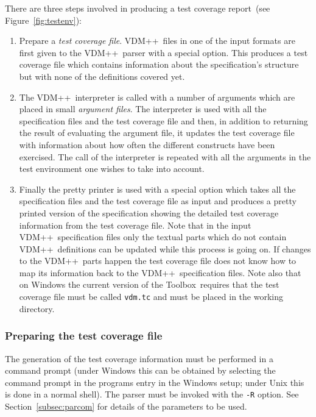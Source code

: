 \documentclass[\pformat,12pt]{article}
\newcommand{\vdmslpp}{VDM++}
\newcommand{\Toolbox}{Toolbox}
\begin{document}
There are three steps involved in producing a test coverage
report~(see Figure~\ref{fig:testenv}):

\begin{enumerate}

\item Prepare a {\em test coverage file}.
  \vdmslpp\ files in one of the input formats are first given to the
  \vdmslpp\ parser with a special option. This produces a test
  coverage file which contains information about the specification's
  structure but with none of the  definitions covered yet.

\item The \vdmslpp\ interpreter is called with a number of arguments
   which are placed in small {\em argument files\/}. The interpreter is used
  with all the specification files and the test coverage file and
  then, in addition to returning the result of evaluating the argument
  file, it updates the test coverage file with information about how
  often the different constructs have been exercised. The call of the
  interpreter is repeated with all the arguments in the test
  environment one wishes to take into account.
  
\item Finally the pretty printer is used with a special option which
  takes all the specification files and the test coverage file as
  input and 
  produces a pretty printed version of the specification showing the
  detailed test coverage information from the test coverage file.
  Note that in the input \vdmslpp\ specification files only the
  textual parts which do not contain \vdmslpp\ definitions can be
  updated while this process is going on. If changes to the \vdmslpp\ 
  parts happen the test coverage file does not know how to map its
  information back to the \vdmslpp\ specification files. Note also that on
  Windows the current version of the \Toolbox\ requires that the test
  coverage file must be called \texttt{vdm.tc} and must be
  placed in the working directory.


\end{enumerate}


\subsubsection{Preparing the test coverage file}

The generation of the test coverage information must be performed in a
command prompt (under Windows this can be obtained by selecting the
command prompt in the programs entry in the Windows setup; under
Unix this is done in a normal shell). The parser must be invoked with
 the {\tt -R} option. See
Section~\ref{subsec:parcom} for details of the parameters to be used.
\end{document}
